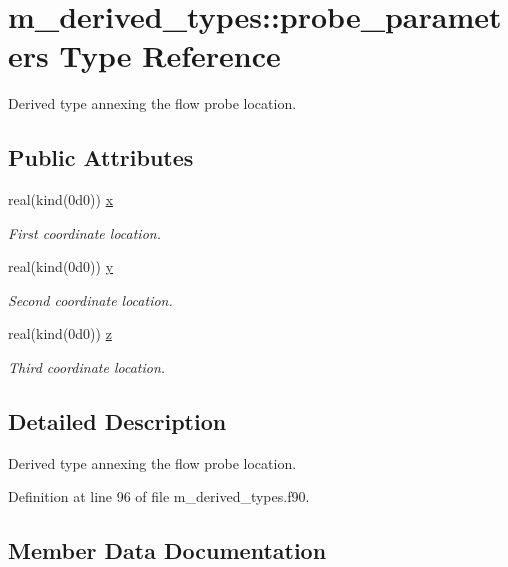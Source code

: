 \hypertarget{structm__derived__types_1_1probe__parameters}{}\section{m\+\_\+derived\+\_\+types\+:\+:probe\+\_\+parameters Type Reference}
\label{structm__derived__types_1_1probe__parameters}


Derived type annexing the flow probe location.  


\subsection*{Public Attributes}
\begin{DoxyCompactItemize}
\item 
real(kind(0d0)) \hyperlink{structm__derived__types_1_1probe__parameters_ae4003401d1a57fc77cbcabd2e10c96da}{x}
\begin{DoxyCompactList}\small\item\em First coordinate location. \end{DoxyCompactList}\item 
real(kind(0d0)) \hyperlink{structm__derived__types_1_1probe__parameters_a47d35ecfdaff4ad8b95c9aaf29724ee1}{y}
\begin{DoxyCompactList}\small\item\em Second coordinate location. \end{DoxyCompactList}\item 
real(kind(0d0)) \hyperlink{structm__derived__types_1_1probe__parameters_a27a66fd7ee42fff5836c08b65210d7f3}{z}
\begin{DoxyCompactList}\small\item\em Third coordinate location. \end{DoxyCompactList}\end{DoxyCompactItemize}


\subsection{Detailed Description}
Derived type annexing the flow probe location. 

Definition at line 96 of file m\+\_\+derived\+\_\+types.\+f90.



\subsection{Member Data Documentation}
\mbox{\label{structm__derived__types_1_1probe__parameters_ae4003401d1a57fc77cbcabd2e10c96da}} 
